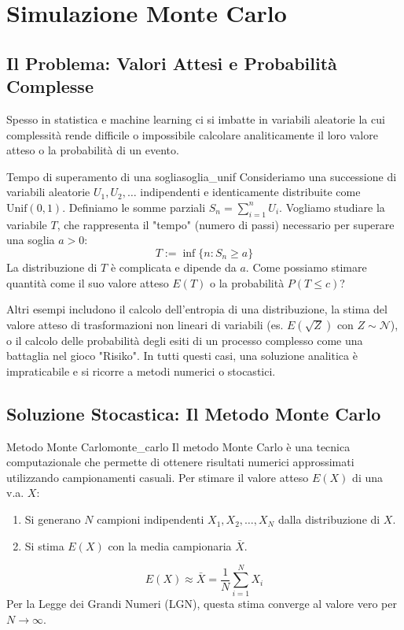 \section{Simulazione Monte Carlo}\label{sec:monte_carlo}

\subsection{Il Problema: Valori Attesi e Probabilità Complesse}
Spesso in statistica e machine learning ci si imbatte in variabili aleatorie la
cui complessità rende difficile o impossibile calcolare analiticamente il loro
valore atteso o la probabilità di un evento.

\begin{esempio}{Tempo di superamento di una soglia}{soglia_unif}
Consideriamo una successione di variabili aleatorie \(U_1, U_2, \dots\)
indipendenti e identicamente distribuite come \(\text{Unif}(0,1)\). Definiamo le
somme parziali \(S_n = \sum_{i=1}^n U_i\).
Vogliamo studiare la variabile \(T\), che rappresenta il "tempo" (numero di
passi) necessario per superare una soglia \(a>0\):
\[
T := \inf\{n : S_n \ge a\}
\]
La distribuzione di \(T\) è complicata e dipende da \(a\). Come possiamo
stimare quantità come il suo valore atteso \(E(T)\) o la probabilità \(P(T \le
c)\)?
\end{esempio}

Altri esempi includono il calcolo dell'entropia di una distribuzione, la stima
del valore atteso di trasformazioni non lineari di variabili (es.
\(E(\sqrt{Z})\) con \(Z \sim \mathcal{N}\)), o il calcolo delle probabilità
degli esiti di un processo complesso come una battaglia nel gioco "Risiko". In
tutti questi casi, una soluzione analitica è impraticabile e si ricorre a
metodi numerici o stocastici.

\subsection{Soluzione Stocastica: Il Metodo Monte Carlo}

\begin{definizione}{Metodo Monte Carlo}{monte_carlo}
Il metodo Monte Carlo è una tecnica computazionale che permette di ottenere
risultati numerici approssimati utilizzando campionamenti casuali. Per stimare
il valore atteso \(E(X)\) di una v.a. \(X\):
\begin{enumerate}
    \item Si generano \(N\) campioni indipendenti \(X_1, X_2, \dots, X_N\) dalla
    distribuzione di \(X\).
    \item Si stima \(E(X)\) con la media campionaria \(\bar{X}\).
\end{enumerate}
\[
E(X) \approx \bar{X} = \frac{1}{N} \sum_{i=1}^N X_i
\]
Per la Legge dei Grandi Numeri (LGN), questa stima converge al valore vero per
\(N \to \infty\).
\end{definizione}



